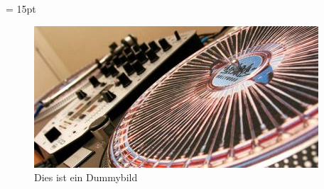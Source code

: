 \documentclass[a4paper]{article}
\begin{document}
\leftskip = 15pt %

		\blindtext[1]
		
		\blindtext[1]
		
		\blindtext[1]
		
		\begin{figure}[htbp]
			\centering
			\includegraphics{dummypic}
			\caption{Dies ist ein Dummybild}
			\label{fig:dummybild}
		\end{figure}	
\end{document}
